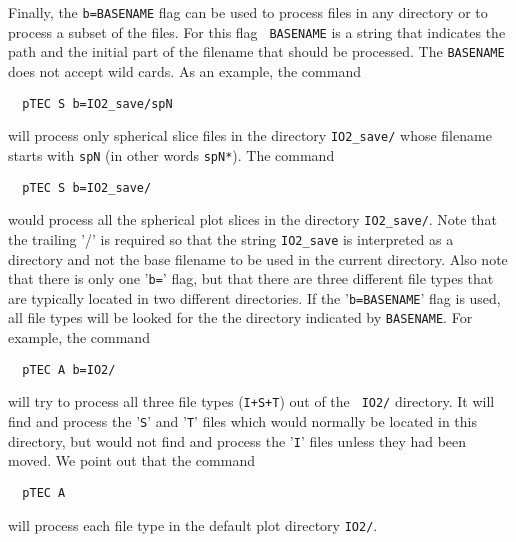 Finally, the {\tt b=BASENAME} flag can be used to process files in any
directory or to process a subset of the files.  For this flag {\tt
BASENAME} is a string that indicates the path and the initial part of the
filename that should be processed.  The {\tt BASENAME} does not accept
wild cards.  As an example, the command
\begin{verbatim}
  pTEC S b=IO2_save/spN
\end{verbatim}
will process only spherical slice files in the directory {\tt IO2\_save/}
whose filename starts with {\tt spN} (in other words {\tt spN*}).
The command 
\begin{verbatim}
  pTEC S b=IO2_save/
\end{verbatim}
would process all the spherical plot slices in the directory {\tt IO2\_save/}.
Note that the trailing '/' is required so that the string {\tt IO2\_save}
is interpreted as a directory and not the base filename to be used
in the current directory.  Also note that there is only one '{\tt b=}' flag,
but that there are three different file types that are typically located
in two different directories.  If the  '{\tt b=BASENAME}' flag is used, all
file types will be looked for the the directory indicated by {\tt BASENAME}.
For example, the command 
\begin{verbatim}
  pTEC A b=IO2/
\end{verbatim}
will try to process all three file types ({\tt I+S+T}) out of the {\tt
IO2/} directory.  It will find and process the '{\tt S}' and '{\tt T}'
files which would normally be located in this directory, but would not
find and process the '{\tt I}' files unless they had been moved.  We
point out that the command
\begin{verbatim}
  pTEC A 
\end{verbatim}
will process each file type in the default plot directory {\tt IO2/}.

